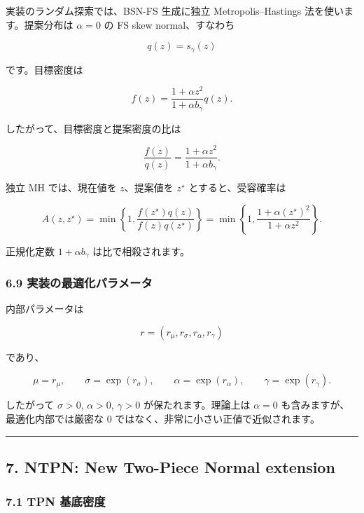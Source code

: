 \documentclass[
]{article}
\begin{document}
実装のランダム探索では、BSN-FS 生成に独立 Metropolis--Hastings
法を使います。提案分布は \(\alpha=0\) の FS skew normal、すなわち

\[
q(z)=s_\gamma(z)
\]

です。目標密度は

\[
f(z)=\frac{1+\alpha z^2}{1+\alpha b_\gamma}q(z).
\]

したがって、目標密度と提案密度の比は

\[
\frac{f(z)}{q(z)}=\frac{1+\alpha z^2}{1+\alpha b_\gamma}.
\]

独立 MH では、現在値を \(z\)、提案値を \(z^\star\) とすると、受容確率は

\[
A(z,z^\star)=
\min\left\{1,
\frac{f(z^\star)q(z)}{f(z)q(z^\star)}
\right\}
=\min\left\{1,
\frac{1+\alpha (z^\star)^2}{1+\alpha z^2}
\right\}.
\]

正規化定数 \(1+\alpha b_\gamma\) は比で相殺されます。

\hypertarget{ux5b9fux88c5ux306eux6700ux9069ux5316ux30d1ux30e9ux30e1ux30fcux30bf-2}{%
\subsubsection{6.9
実装の最適化パラメータ}\label{ux5b9fux88c5ux306eux6700ux9069ux5316ux30d1ux30e9ux30e1ux30fcux30bf-2}}

内部パラメータは

\[
r=(r_\mu,r_\sigma,r_\alpha,r_\gamma)
\]

であり、

\[
\mu=r_\mu,
\qquad
\sigma=\exp(r_\sigma),
\qquad
\alpha=\exp(r_\alpha),
\qquad
\gamma=\exp(r_\gamma).
\]

したがって \(\sigma>0\), \(\alpha>0\), \(\gamma>0\)
が保たれます。理論上は \(\alpha=0\) も含みますが、最適化内部では厳密な 0
ではなく、非常に小さい正値で近似されます。

\begin{center}\rule{0.5\linewidth}{0.5pt}\end{center}

\hypertarget{ntpn-new-two-piece-normal-extension}{%
\subsection{7. NTPN: New Two-Piece Normal
extension}\label{ntpn-new-two-piece-normal-extension}}

\hypertarget{tpn-ux57faux5e95ux5bc6ux5ea6}{%
\subsubsection{7.1 TPN 基底密度}\label{tpn-ux57faux5e95ux5bc6ux5ea6}}
\end{document}
